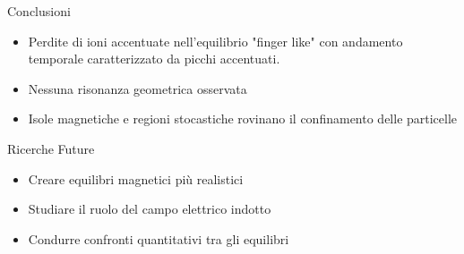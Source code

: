 \begin{frame}
\begin{block}{Conclusioni}
	\begin{center}
	\begin{itemize}
		\item Perdite di ioni accentuate nell'equilibrio "finger like" con andamento temporale caratterizzato da picchi accentuati.
		\item Nessuna risonanza geometrica osservata
		\item Isole magnetiche e regioni stocastiche rovinano il confinamento delle particelle
	\end{itemize}
	\end{center}
\end{block}
\begin{block}{Ricerche Future}
\begin{center}
\begin{itemize}
	\item Creare equilibri magnetici più realistici
	\item Studiare il ruolo del campo elettrico indotto
	\item Condurre confronti quantitativi tra gli equilibri
\end{itemize}
\end{center}
\end{block}
\end{frame}